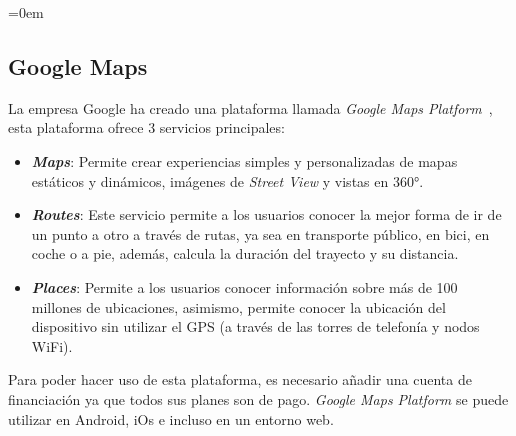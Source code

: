 \parindent=0em
\subsection{Google Maps}
\noindent

La empresa Google ha creado una plataforma llamada \textit{Google Maps Platform}~\cite{googlemapsPlatform}, esta plataforma ofrece 3 servicios principales:

\begin{itemize}
    \item \textit{\textbf{Maps}}: Permite crear experiencias simples y personalizadas de mapas estáticos y dinámicos, imágenes de \textit{Street View} y vistas en 360°.
    
    \item \textit{\textbf{Routes}}: Este servicio permite a los usuarios conocer la mejor forma de ir de un punto a otro a través de rutas, ya sea en transporte público, en bici, en coche o a pie, además, calcula la duración del trayecto y su distancia.
    
    \item \textit{\textbf{Places}}: Permite a los usuarios conocer información sobre más de 100 millones de ubicaciones, asimismo, permite conocer la ubicación del dispositivo sin utilizar el GPS (a través de las torres de telefonía y nodos WiFi).
    
\end{itemize}

Para poder hacer uso de esta plataforma, es necesario añadir una cuenta de financiación ya que todos sus planes son de pago. \textit{Google Maps Platform} se puede utilizar en Android, iOs e incluso en un entorno web.